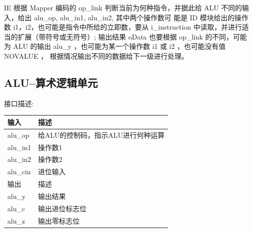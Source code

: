 \documentclass[10pt]{article}
\begin{document}
\begin{CJK}{UTF8}{gbsn}
IE 根据 Mapper 编码的 op\_link 判断当前为何种指令，并据此给 ALU 不同的输入，给出 alu\_op, alu\_in1, alu\_in2, 其中两个操作数可
能是 ID 模块给出的操作数 i1，i2，也可能是指令中所给的立即数，要从 i\_instruction 中读取，并进行适当的扩展（带符号或无符号）;
输出结果 oData 也要根据 op\_link 的不同，可能为 ALU 的输出 alu\_y ，也可能为某一个操作数 i1 或 i2 ，也可能没有值NOVALUE ，
根据情况输出不同的数据给下一级进行处理。

\subsection{ALU--算术逻辑单元}
接口描述:\\
\begin{center}
\begin{tabular}{|l|l|}\hline
输入&描述\\\hline
alu\_op&给ALU的控制码，指示ALU进行何种运算\\\hline
alu\_in1&操作数1\\\hline
alu\_in2&操作数2\\\hline
alu\_cin&进位输入\\\hline\hline
输出&描述\\\hline
alu\_y&输出结果\\\hline
alu\_c&输出进位标志位\\\hline
alu\_z&输出零标志位\\\hline
\end{tabular}
\end{center}



\end{CJK}
\end{document}
